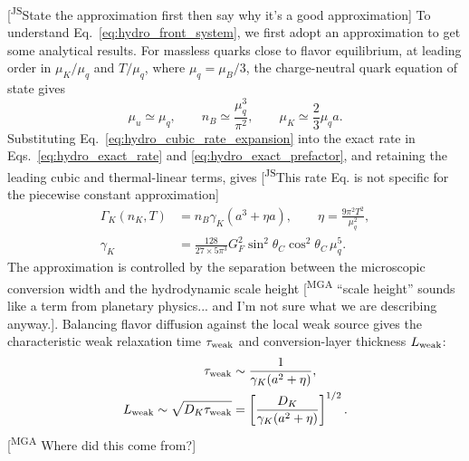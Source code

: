 \documentclass[10pt,superscriptaddress,
amsmath,aps,prc,twocolumn,nofootinbib,floatfix]{revtex4-1}
\newcommand{\mgacom}[1]{\textsf{\color[rgb]{0.7,0,0}[\textsuperscript{MGA} #1]}}
\newcommand{\AHcom}[1]{\textsf{\color{cyan}{\textsuperscript{AH}#1}}}
\newcommand{\JScom}[1]{\textsf{\color{violet} [\textsuperscript{JS}#1]}}
\begin{document}
\JScom{State the approximation first then say why it's a good approximation}
To understand Eq.~\eqref{eq:hydro_front_system}, we first adopt an approximation to get some analytical results. 
For massless quarks close to flavor equilibrium, at leading order in
$\mu_K/\mu_q$ and $T/\mu_q$, where $\mu_q=\mu_B/3$, the charge-neutral quark
equation of state gives
\begin{equation}
 \mu_u\simeq\mu_q,
 \qquad
 n_B\simeq\frac{\mu_q^3}{\pi^2},
 \qquad
 \mu_K\simeq\frac{2}{3}\mu_q a.
\label{eq:hydro_cubic_rate_expansion}
\end{equation}
Substituting Eq.~\eqref{eq:hydro_cubic_rate_expansion} into the exact rate in
Eqs.~\eqref{eq:hydro_exact_rate} and \eqref{eq:hydro_exact_prefactor}, and
retaining the leading cubic and thermal-linear terms, gives \JScom{This rate Eq. is not specific for the piecewise constant approximation}
\begin{subequations}
\label{eq:hydro_cubic_rate}
\begin{align}
 \Gamma_K(n_K,T)
 &=n_B\gamma_K\left(a^3+\eta a\right),
 \qquad
 \eta=\frac{9\pi^2T^2}{\mu_q^2},
\label{eq:hydro_source}\\
 \gamma_K
 &=\frac{128}{27\times5\pi^3}
 G_F^2\sin^2\theta_C\cos^2\theta_C\,\mu_q^5.
\label{eq:hydro_gammaK}
\end{align}
\end{subequations}
\AHcom{rates in terms of mu or a?}
The approximation is controlled by the separation between the microscopic conversion width and the hydrodynamic scale height \mgacom{``scale height'' sounds like a term from planetary physics... and I'm not sure what we are describing anyway.}.  
Balancing flavor diffusion against the local weak source gives the characteristic weak relaxation time $\tau_{\rm weak}$ and conversion-layer thickness
$L_{\rm weak}$:
\begin{align}
 \tau_{\rm weak}&\sim
 \frac{1}{\gamma_K(a^2+\eta)},
\notag\\
 L_{\rm weak}\sim
 \sqrt{D_K\tau_{\rm weak}}
 &=
 \left[\frac{D_K}{\gamma_K(a^2+\eta)}\right]^{1/2}.
\label{eq:hydro_weak_length}
\end{align}
\mgacom{Where did this come from?}
\end{document}
